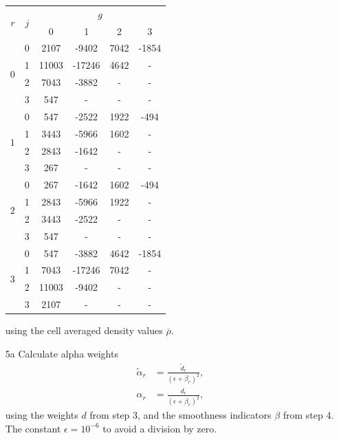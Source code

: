 \begin{enumerate}
		\begin{center}
			\begin{tabular}{|c|c|cccc|}
			\hline
				 \multirow{2}{*}{$r$} & \multirow{2}{*}{$j$} & \multicolumn{4}{c|}{$g$} \\
				  & & 0 & 1 & 2 & 3 \\
			\hline
				 \multirow{4}{*}{$0$}  & 0 & 2107 & -9402 & 7042 & -1854 \\
				                                      & 1 & 11003 & -17246 & 4642 & - \\
				                                      & 2 & 7043 & -3882 & - & - \\
				                                      & 3 & 547 & - & - & - \\
			\hline
				 \multirow{4}{*}{$1$}  & 0 & 547 & -2522 & 1922 & -494 \\
				                                      & 1 & 3443 & -5966 & 1602 & - \\
				                                      & 2 & 2843 & -1642 & - & - \\
				                                      & 3 & 267 & - & - & - \\
			\hline
				 \multirow{4}{*}{$2$}  & 0 & 267 & -1642 & 1602 & -494 \\
				                                      & 1 & 2843 & -5966 & 1922 & - \\
				                                      & 2 & 3443 & -2522 & - & - \\
				                                      & 3 & 547 & - & - & - \\
			\hline
				 \multirow{4}{*}{$3$}  & 0 & 547 & -3882 & 4642 & -1854 \\
				                                      & 1 & 7043 & -17246 & 7042 & - \\
				                                      & 2 & 11003 & -9402 & - & - \\
				                                      & 3 & 2107 & - & - & - \\
			\hline
			\end{tabular}
		\end{center}
		using the cell averaged density values $\overline\rho$.
		
	\item[5a] Calculate alpha weights
		\begin{align}
			\tilde\alpha_r&=\frac{\tilde d_r}{\left(\epsilon+\beta_r\right)^2},\\
			\alpha_r&=\frac{d_r}{\left(\epsilon+\beta_r\right)^2},
		\end{align}
		using the weights $d$ from step 3, and the smoothness indicators $\beta$ from step 4. The constant $\epsilon=10^{-6}$ to avoid a division by zero.
		

\end{enumerate}
